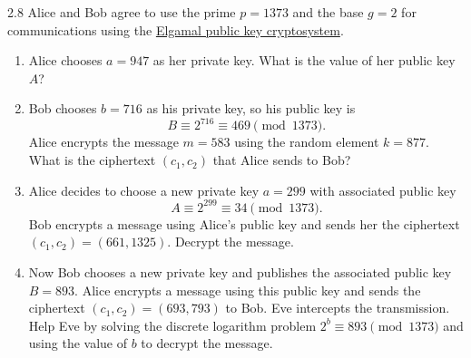 \begin{exercise}
    {2.8} Alice and Bob agree to use the prime \(p = 1373\) and the base \(g = 2\) for communications using the \hyperref[sec:Elgamal]{Elgamal public key cryptosystem}.
    \begin{enumerate}
        \item Alice chooses \(a = 947\) as her private key. What is the value of her public key \(A\)?
        \item Bob chooses \(b = 716\) as his private key, so his public key is
              \[
                  B \equiv 2^{716} \equiv 469 \pmod{1373}.
              \]
              Alice encrypts the message \(m = 583\) using the random element \(k = 877\). What is the ciphertext \((c_1, c_2)\) that Alice sends to Bob?
        \item Alice decides to choose a new private key \(a = 299\) with associated public key
              \[
                  A \equiv 2^{299} \equiv 34 \pmod{1373}.
              \]
              Bob encrypts a message using Alice's public key and sends her the ciphertext \((c_1, c_2) = (661, 1325)\). Decrypt the message.
        \item Now Bob chooses a new private key and publishes the associated public key \(B = 893\). Alice encrypts a message using this public key and sends the ciphertext \((c_1, c_2) = (693, 793)\) to Bob. Eve intercepts the transmission. Help Eve by solving the discrete logarithm problem \(2^b \equiv 893 \pmod{1373}\) and using the value of \(b\) to decrypt the message.
    \end{enumerate}
\end{exercise}



